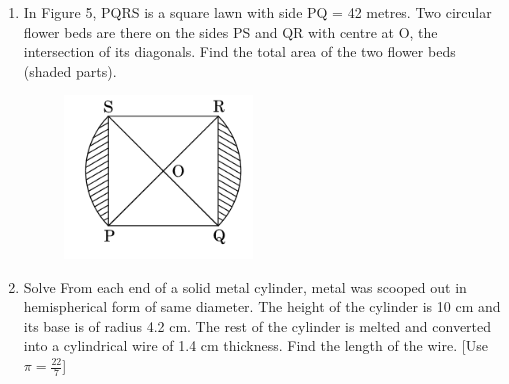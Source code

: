 \documentclass[journal,12pt,twocolumn]{IEEEtran}
\begin{document}
\begin{enumerate}
 \item In Figure 5, PQRS is a square lawn with side PQ = 42 metres. Two circular flower beds are there on the sides PS and QR with centre at O, the intersection of its diagonals. Find the total area of the two flower beds (shaded parts).
 \begin{figure}[H]
    \centering
    \includegraphics[width=5cm]{image5.png}
 \end{figure}
 \item Solve From each end of a solid metal cylinder, metal was scooped out in hemispherical form of same diameter. The height of the cylinder is 10 cm and its base is of radius 4.2 cm. The rest of the cylinder is melted and converted into a cylindrical wire of 1.4 cm thickness. Find the length of the wire. [Use $ \pi=\frac{22}{7} $]
  \end{enumerate}
\end{document}
